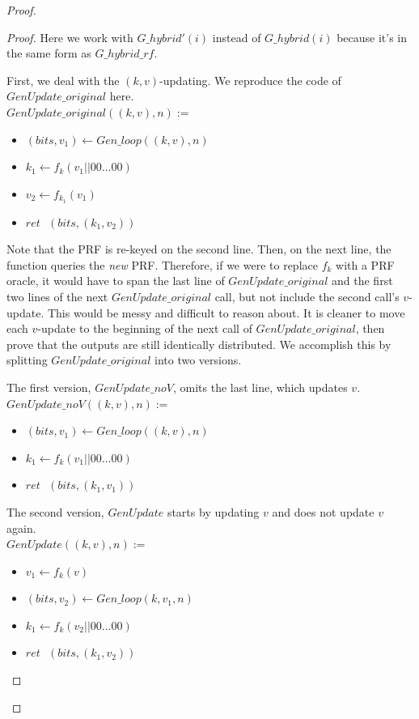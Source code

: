 \documentclass[12pt,lot, lof]{puthesis}
\newenvironment{game}
{ \begin{itemize}[noitemsep,nolistsep] 
}
{ \end{itemize}                  }
\newcommand{\s} {\textrm{ }}
\newcommand{\lar}{\leftarrow}
\begin{document}
{\begin{proof}
\begin{proof}
Here we work with $G\_hybrid'(i)$ instead of $G\_hybrid(i)$ because it's in the same form as $G\_hybrid\_rf$. 

First, we deal with the $(k,v)$-updating. We reproduce the code of $GenUpdate\_original$ here. \\
 
$GenUpdate\_original((k,v), n) :=$
\begin{game}
\item[] $(bits, v_1) \lar Gen\_loop((k,v), n)$
\item[] $k_1 \lar f_k(v_1 || 00 \ldots 00)$
\item[] $v_2 \lar f_{k_1}(v_1)$
\item[] $ret \s (bits, (k_1, v_2))$\\
\end{game}

Note that the PRF is re-keyed on the second line. Then, on the next line, the function queries the \emph{new} PRF. Therefore, if we were to replace $f_k$ with a PRF oracle, it would have to span the last line of $GenUpdate\_original$ and the first two lines of the next $GenUpdate\_original$ call, but not include the second call's $v$-update. This would be messy and difficult to reason about. It is cleaner to move each $v$-update to the beginning of the next call of $GenUpdate\_original$, then prove that the outputs are still identically distributed. We accomplish this by splitting $GenUpdate\_original$ into two versions.

The first version, $GenUpdate\_noV$, omits the last line, which updates $v$. \\

$GenUpdate\_noV((k,v), n) :=$
\begin{game}
\item[] $(bits, v_1) \lar Gen\_loop((k,v), n)$
\item[] $k_1 \lar f_k(v_1 || 00 \ldots 00)$
\item[] $ret \s (bits, (k_1, v_1))$\\
\end{game}

The second version, $GenUpdate$ starts by updating $v$ and does not update $v$ again. \\

$GenUpdate((k,v), n) :=$
\begin{game}
\item[] $v_1 \lar f_k(v)$
\item[] $(bits, v_2) \lar Gen\_loop(k, v_1, n)$
\item[] $k_1 \lar f_k(v_2 || 00 \ldots 00)$
\item[] $ret \s (bits, (k_1, v_2))$\\
\end{game}


\end{proof}
\end{proof}}
\end{document}
